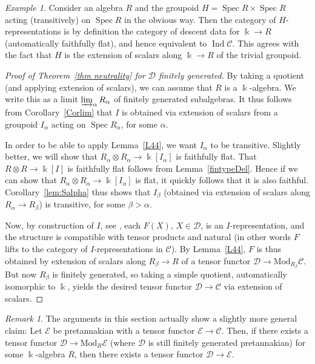 \documentclass[11pt]{amsart}
\def\Ind{\operatorname{Ind}}
\def\Ds{\mathscr{D}}
\def\cC{\mathscr{C}}
\def\bk{\Bbbk}
\def\Spec{\operatorname{Spec}}
\def\Mod{\mathrm{Mod}}
\theoremstyle{definition}
\theoremstyle{remark}
\newtheorem{remark}[thm]{Remark}
\newtheorem{example}[thm]{Example}
\numberwithin{equation}{section}
\begin{document}
\begin{example}
    Consider an algebra $R$ and the groupoid $H=\Spec R\times \Spec R$ acting (transitively) on $\Spec R$ in the obvious way. Then the category of $H$-representations is by definition the category of descent data for $\bk\to R$ (automatically faithfully flat), and hence equivalent to $\Ind\cC$. This agrees with the fact that $H$ is the extension of scalars along $\bk\to R$ of the trivial groupoid.
\end{example}



\begin{proof}[Proof of Theorem~\ref{thm neutrality} for $\Ds$ finitely generated]
    By taking a quotient (and applying extension of scalars), we can assume that $R$ is a $\bk$-algebra. We write this as a limit $\varinjlim_\alpha R_\alpha$ of finitely generated subalgebras. It thus follows from Corollary~\ref{Corlim} that $I$ is obtained via extension of scalars from a groupoid $I_\alpha$ acting on $\Spec R_\alpha$, for some $\alpha$.

    In order to be able to apply Lemma~\ref{L44}, we want $I_\alpha$ to be transitive. Slightly better, we will show that $R_\alpha\otimes R_\alpha\to \bk[I_\alpha]$ is faithfully flat. That $R\otimes R\to \bk[I]$ is faithfully flat follows from Lemma~\ref{fintypeDel}. Hence if we can show that $R_\alpha\otimes R_\alpha\to \bk[I_\alpha]$ is flat, it quickly follows that it is also faithful. Corollary~\ref{lem:Salpha} thus shows that $I_\beta$ (obtained via extension of scalars along $R_\alpha\to R_\beta$) is transitive, for some $\beta>\alpha$.

    Now, by construction of $I$, see \cite[\S 3.10]{Del02}, each $F(X)$, $X\in\Ds$, is an $I$-representation, and the structure is compatible with tensor products and natural (in other words $F$ lifts to the category of $I$-representations in $\cC$). By Lemma~\ref{L44}, $F$ is thus obtained by extension of scalars along $R_\beta\to R$ of a tensor functor $\Ds\to\Mod_{R_\beta}\cC$. But now $R_\beta$ is finitely generated, so taking a simple quotient, automatically isomorphic to $\bk$, yields the desired tensor functor $\Ds\to\cC$ via extension of scalars.
\end{proof}


\begin{remark}
    The arguments in this section actually show a slightly more general claim: Let $\mathscr{E}$ be pretannakian with a tensor functor $\mathscr{E}\to\cC$. Then, if there exists a tensor functor $\Ds\to\Mod_R\mathscr{E}$ (where $\Ds$ is still finitely generated pretannakian) for some $\bk$-algebra $R$, then there exists a tensor functor $\Ds\to\mathscr{E}$.
\end{remark}
\end{document}
